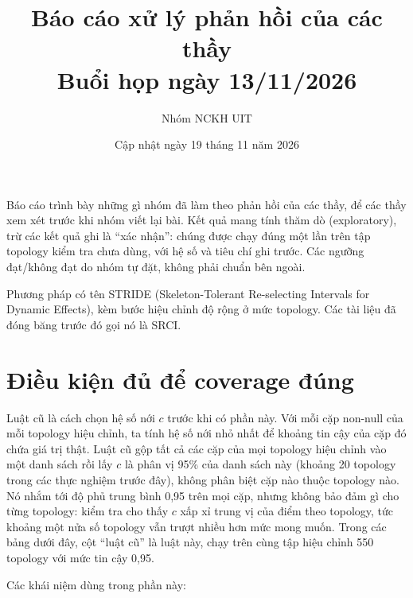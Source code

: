 \documentclass[11pt,a4paper]{article}
\title{\textbf{Báo cáo xử lý phản hồi của các thầy}\\[2pt]\large Buổi họp ngày 13/11/2026}
\author{Nhóm NCKH UIT}
\date{Cập nhật ngày 19 tháng 11 năm 2026}
\begin{document}
\maketitle

Báo cáo trình bày những gì nhóm đã làm theo phản hồi của các thầy, để các thầy xem xét trước khi nhóm viết lại bài. Kết quả mang tính thăm dò (exploratory), trừ các kết quả ghi là ``xác nhận'': chúng được chạy đúng một lần trên tập topology kiểm tra chưa dùng, với hệ số và tiêu chí ghi trước. Các ngưỡng đạt/không đạt do nhóm tự đặt, không phải chuẩn bên ngoài.

Phương pháp có tên STRIDE (Skeleton-Tolerant Re-selecting Intervals for Dynamic Effects), kèm bước hiệu chỉnh độ rộng ở mức topology. Các tài liệu đã đóng băng trước đó gọi nó là SRCI.

\section{Điều kiện đủ để coverage đúng}

Luật cũ là cách chọn hệ số nới $c$ trước khi có phần này. Với mỗi cặp non-null của mỗi topology hiệu chỉnh, ta tính hệ số nới nhỏ nhất để khoảng tin cậy của cặp đó chứa giá trị thật. Luật cũ gộp tất cả các cặp của mọi topology hiệu chỉnh vào một danh sách rồi lấy $c$ là phân vị 95\% của danh sách này (khoảng 20 topology trong các thực nghiệm trước đây), không phân biệt cặp nào thuộc topology nào. Nó nhắm tới độ phủ trung bình 0,95 trên mọi cặp, nhưng không bảo đảm gì cho từng topology: kiểm tra cho thấy $c$ xấp xỉ trung vị của điểm theo topology, tức khoảng một nửa số topology vẫn trượt nhiều hơn mức mong muốn. Trong các bảng dưới đây, cột ``luật cũ'' là luật này, chạy trên cùng tập hiệu chỉnh 550 topology với mức tin cậy 0,95.

Các khái niệm dùng trong phần này:
\end{document}
